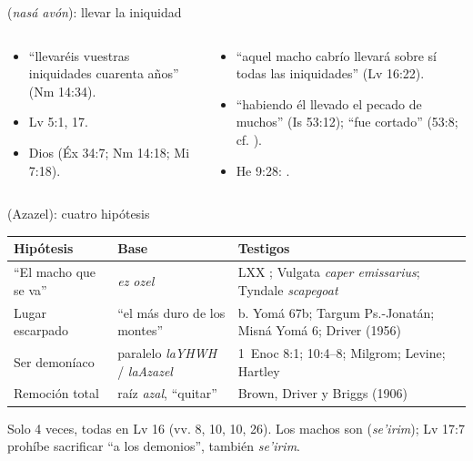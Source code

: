 \begin{frame}{ (\emph{nasá avón}): llevar la iniquidad}
\begin{columns}[t,onlytextwidth]
\begin{column}{0.49\textwidth}\small
{}
\begin{itemize}
\item ``llevaréis vuestras iniquidades cuarenta años'' (Nm 14:34).
\item Lv 5:1, 17.
\end{itemize}
\begin{itemize}
\item Dios  (Éx 34:7; Nm 14:18; Mi 7:18).
\end{itemize}
\end{column}
\begin{column}{0.49\textwidth}\small
{}
\begin{itemize}
\item ``aquel macho cabrío llevará sobre sí todas las iniquidades'' (Lv 16:22).
\item ``habiendo él llevado el pecado de muchos'' (Is 53:12); ``fue cortado''  (53:8; cf. ).
\item He 9:28: .
\end{itemize}
\end{column}
\end{columns}
\end{frame}

\begin{frame}{ (Azazel): cuatro hipótesis}
\scriptsize\renewcommand{\arraystretch}{1.18}
\begin{tabular}{@{}L{2.9cm}L{4.6cm}L{4.0cm}@{}}
\toprule
\textbf{Hipótesis} & \textbf{Base} & \textbf{Testigos} \\ \midrule
``El macho que se va'' &  \emph{ez ozel} & LXX ; Vulgata \emph{caper emissarius}; Tyndale \emph{scapegoat} \\
Lugar escarpado & ``el más duro de los montes'' & b. Yomá 67b; Targum Ps.-Jonatán; Misná Yomá 6; Driver (1956) \\
Ser demoníaco & paralelo \emph{laYHWH} / \emph{laAzazel} & 1~Enoc 8:1; 10:4--8; Milgrom; Levine; Hartley \\
Remoción total & raíz \emph{azal}, ``quitar'' & Brown, Driver y Briggs (1906) \\
\bottomrule
\end{tabular}\par\medskip
\small Solo 4 veces, todas en Lv 16 (vv. 8, 10, 10, 26). Los machos son  (\emph{se'irim}); Lv 17:7 prohíbe sacrificar ``a los demonios'', también \emph{se'irim}.
\end{frame}

